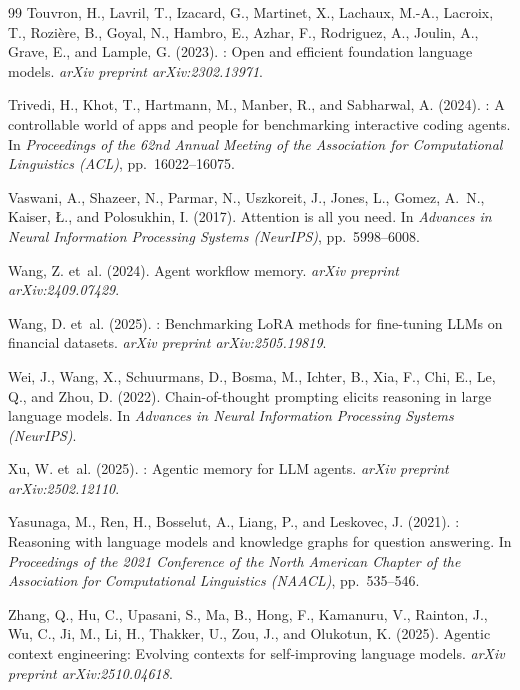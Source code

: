 \documentclass[12pt,a4paper,oneside]{article}
\begin{document}
\begin{thebibliography}{99}
Touvron, H., Lavril, T., Izacard, G., Martinet, X., Lachaux, M.-A., Lacroix, T., Rozi\`ere, B., Goyal, N., Hambro, E., Azhar, F., Rodriguez, A., Joulin, A., Grave, E., and Lample, G. (2023).
: Open and efficient foundation language models.
\newblock \textit{arXiv preprint arXiv:2302.13971}.

Trivedi, H., Khot, T., Hartmann, M., Manber, R., and Sabharwal, A. (2024).
: A controllable world of apps and people for benchmarking interactive coding agents.
\newblock In \textit{Proceedings of the 62nd Annual Meeting of the Association for Computational Linguistics (ACL)}, pp.~16022--16075.

Vaswani, A., Shazeer, N., Parmar, N., Uszkoreit, J., Jones, L., Gomez, A.~N., Kaiser, \L., and Polosukhin, I. (2017).
\newblock Attention is all you need.
\newblock In \textit{Advances in Neural Information Processing Systems (NeurIPS)}, pp.~5998--6008.

Wang, Z. et~al. (2024).
\newblock Agent workflow memory.
\newblock \textit{arXiv preprint arXiv:2409.07429}.

Wang, D. et~al. (2025).
: Benchmarking {LoRA} methods for fine-tuning {LLMs} on financial datasets.
\newblock \textit{arXiv preprint arXiv:2505.19819}.

Wei, J., Wang, X., Schuurmans, D., Bosma, M., Ichter, B., Xia, F., Chi, E., Le, Q., and Zhou, D. (2022).
\newblock Chain-of-thought prompting elicits reasoning in large language models.
\newblock In \textit{Advances in Neural Information Processing Systems (NeurIPS)}.

Xu, W. et~al. (2025).
: Agentic memory for {LLM} agents.
\newblock \textit{arXiv preprint arXiv:2502.12110}.

Yasunaga, M., Ren, H., Bosselut, A., Liang, P., and Leskovec, J. (2021).
: Reasoning with language models and knowledge graphs for question answering.
\newblock In \textit{Proceedings of the 2021 Conference of the North American Chapter of the Association for Computational Linguistics (NAACL)}, pp.~535--546.

Zhang, Q., Hu, C., Upasani, S., Ma, B., Hong, F., Kamanuru, V., Rainton, J., Wu, C., Ji, M., Li, H., Thakker, U., Zou, J., and Olukotun, K. (2025).
\newblock Agentic context engineering: Evolving contexts for self-improving language models.
\newblock \textit{arXiv preprint arXiv:2510.04618}.


\end{thebibliography}
\end{document}
